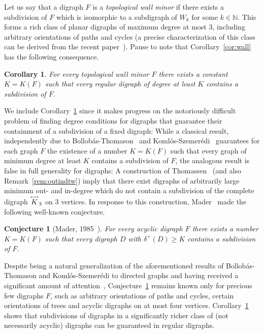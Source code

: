 \documentclass[a4paper,10pt]{article}
\newtheorem{corollary}[theorem]{Corollary}
\newtheorem{conjecture}{Conjecture}
\newcommand{\bivec}[1]{\overset{\text{\tiny$\longleftrightarrow$}}{#1}}
\begin{document}
Let us say that a digraph $F$ is a \emph{topological wall minor} if there exists a subdivision of $F$ which is isomorphic to a subdigraph of $W_k$ for some $k\in \mathbb{N}$. This forms a rich class of planar digraphs of maximum degree at most $3$, including arbitrary orientations of paths and cycles (a precise characterization of this class can be derived from the recent paper~\cite{MR4657706}). Pause to note that Corollary~\ref{cor:wall} has the following consequence.
\begin{corollary}\label{cor:top}
For every topological wall minor $F$ there exists a constant $K=K(F)$ such that every regular digraph of degree at least $K$ contains a subdivision of $F$.  
\end{corollary}
We include Corollary~\ref{cor:top} since it makes progress on the notoriously difficult problem of finding degree conditions for digraphs that guarantee their containment of a subdivision of a fixed digraph: While a classical result, independently due to Bollob\'{a}s-Thomason~\cite{MR1657911} and Koml\'{o}s-Szemer\'{e}di~\cite{MR1288443,MR1395694} guarantees for each graph $F$ the existence of a number $K=K(F)$ such that every graph of minimum degree at least $K$ contains a subdivision of $F$, the analogous result is false in full generality for digraphs: A construction of Thomassen~\cite{MR793491} (and also Remark~\ref{rem:outindtw}) imply that there exist digraphs of arbitrarily large minimum out- and in-degree which do not contain a subdivision of the complete digraph $\bivec{K}_3$ on $3$ vertices. In response to this construction, Mader~\cite{MR815582} made the following well-known conjecture.
\begin{conjecture}[Mader, 1985~\cite{MR815582}]\label{con:mader}
For every acyclic digraph $F$ there exists a number $K=K(F)$ such that every digraph $D$ with $\delta^+(D)\ge K$ contains a subdivision of $F$.
\end{conjecture}
Despite being a natural generalization of the aforementioned results of Bollob\'{a}s-Thomason and Koml\'{o}s-Szemer\'{e}di to directed graphs and having received a significant amount of attention~\cite{MR3992294,MR4757005, MR4155283,MR4543727,MR2370179,MR3906644,MR1364025,MR1377610}, Conjecture~\ref{con:mader} remains known only for precious few digraphs $F$, such as arbitrary orientations of paths and cycles, certain orientations of trees and acyclic digraphs on at most four vertices. Corollary~\ref{cor:top} shows that subdivisions of digraphs in a significantly richer class of (not necessarily acyclic) digraphs can be guaranteed in regular digraphs.
\end{document}
